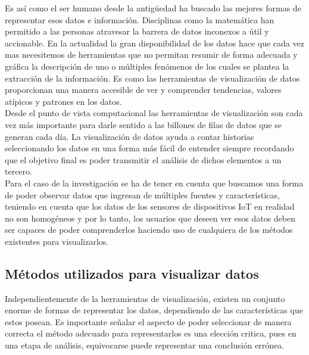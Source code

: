 Es así como el ser humano desde la antigüedad ha buscado las mejores formas de representar esos datos e información. Disciplinas como la matemática han permitido a las personas atravesar la barrera de datos inconexos a  útil y accionable. En la actualidad la gran disponibilidad de los datos hace que cada vez mas necesitemos de herramientas que no permitan resumir de forma adecuada y gráfica la descripción de uno o múltiples fenómenos de los cuales se plantea la extracción de la información. Es como las herramientas de visualización de datos proporcionan una manera accesible de ver y comprender tendencias, valores atípicos y patrones en los datos.\\

Desde el punto de vista computacional las herramientas de visualización son cada vez más importante para darle sentido a las billones de filas de datos que se generan cada día. La visualización de datos ayuda a contar historias seleccionando los datos en una forma más fácil de entender\cite{visualizaciondef} siempre recordando que el objetivo final es poder transmitir el análisis de dichos elementos a un tercero.\\

Para el caso de la investigación se ha de tener en cuenta que buscamos una forma de poder observar datos que ingresan de múltiples fuentes y características, teniendo en cuenta que los datos de los sensores de dispositivos IoT en realidad no son homogéneos y por lo tanto, los usuarios que deseen ver esos datos deben ser capaces de poder comprenderlos haciendo uso de cualquiera de los métodos existentes para visualizarlos. 

\subsection{Métodos utilizados para visualizar datos}
Independientemente de la herramientas de visualización, existen un conjunto enorme de formas de representar los datos, dependiendo de las características que estos posean. Es importante señalar el aspecto de poder seleccionar de manera correcta el método adecuado para representarlos es una elección critica, pues en una etapa de análisis, equivocarse puede representar una conclusión errónea.\\

